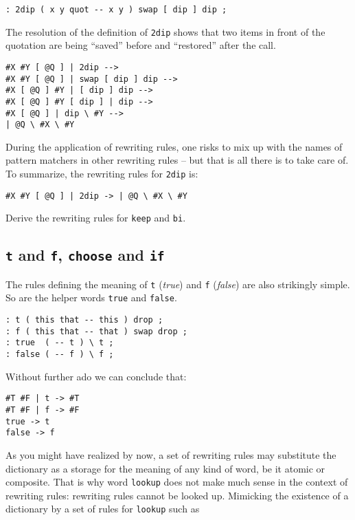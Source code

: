 \begin{verbatim}
: 2dip ( x y quot -- x y ) swap [ dip ] dip ;
\end{verbatim}

The resolution of the definition of \verb|2dip| shows that two items in front of the quotation are being ``saved'' before and ``restored'' after the call.

\begin{verbatim}
#X #Y [ @Q ] | 2dip -->
#X #Y [ @Q ] | swap [ dip ] dip -->
#X [ @Q ] #Y | [ dip ] dip -->
#X [ @Q ] #Y [ dip ] | dip -->
#X [ @Q ] | dip \ #Y -->
| @Q \ #X \ #Y
\end{verbatim}

During the application of rewriting rules, one risks to mix up with the names of pattern matchers in other rewriting rules -- but that is all there is to take care of. To summarize, the rewriting rules for \verb|2dip| is:

\begin{verbatim}
#X #Y [ @Q ] | 2dip -> | @Q \ #X \ #Y
\end{verbatim}

\begin{exercise}\label{ex:keep.bi}
Derive the rewriting rules for \verb|keep| and \verb|bi|.
\end{exercise}

\subsection{\texttt{t} and \texttt{f}, \texttt{choose} and \texttt{if}}

The rules defining the meaning of \verb|t| (\emph{true}) and \verb|f| (\emph{false}) are also strikingly simple. So are the helper words \verb|true| and \verb|false|.

\begin{verbatim}
: t ( this that -- this ) drop ;
: f ( this that -- that ) swap drop ;
: true  ( -- t ) \ t ;
: false ( -- f ) \ f ;
\end{verbatim}

Without further ado we can conclude that:

\begin{verbatim}
#T #F | t -> #T
#T #F | f -> #F
true -> t
false -> f
\end{verbatim}

As you might have realized by now, a set of rewriting rules may substitute the dictionary as a storage for the meaning of any kind of word, be it atomic or composite. That is why word \verb|lookup| does not make much sense in the context of rewriting rules: rewriting rules cannot be looked up. Mimicking the existence of a dictionary by a set of rules for \verb|lookup| such as


